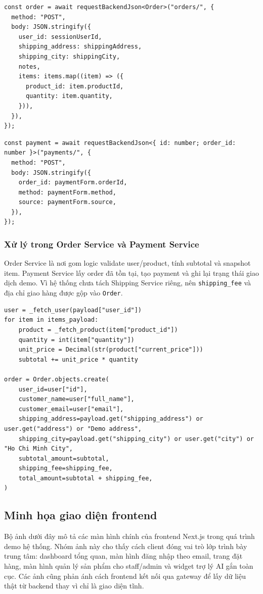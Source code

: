\documentclass[12pt,a4paper]{article}
\begin{document}
\begin{lstlisting}[style=code,caption={Tạo đơn hàng từ giao diện customer order}]
const order = await requestBackendJson<Order>("orders/", {
  method: "POST",
  body: JSON.stringify({
    user_id: sessionUserId,
    shipping_address: shippingAddress,
    shipping_city: shippingCity,
    notes,
    items: items.map((item) => ({
      product_id: item.productId,
      quantity: item.quantity,
    })),
  }),
});
\end{lstlisting}

\begin{lstlisting}[style=code,caption={Dashboard tạo payment từ order}]
const payment = await requestBackendJson<{ id: number; order_id: number }>("payments/", {
  method: "POST",
  body: JSON.stringify({
    order_id: paymentForm.orderId,
    method: paymentForm.method,
    source: paymentForm.source,
  }),
});
\end{lstlisting}

\subsubsection{Xử lý trong Order Service và Payment Service}
Order Service là nơi gom logic validate user/product, tính subtotal và snapshot item. Payment Service lấy order đã tồn tại, tạo payment và ghi lại trạng thái giao dịch demo. Vì hệ thống chưa tách Shipping Service riêng, nên \texttt{shipping\_fee} và địa chỉ giao hàng được gộp vào \texttt{Order}.

\begin{lstlisting}[style=code,caption={Logic tạo order và payment rút gọn theo code hiện tại}]
user = _fetch_user(payload["user_id"])
for item in items_payload:
    product = _fetch_product(item["product_id"])
    quantity = int(item["quantity"])
    unit_price = Decimal(str(product["current_price"]))
    subtotal += unit_price * quantity

order = Order.objects.create(
    user_id=user["id"],
    customer_name=user["full_name"],
    customer_email=user["email"],
    shipping_address=payload.get("shipping_address") or user.get("address") or "Demo address",
    shipping_city=payload.get("shipping_city") or user.get("city") or "Ho Chi Minh City",
    subtotal_amount=subtotal,
    shipping_fee=shipping_fee,
    total_amount=subtotal + shipping_fee,
)
\end{lstlisting}

\subsection{Minh họa giao diện frontend}
Bộ ảnh dưới đây mô tả các màn hình chính của frontend Next.js trong quá trình demo hệ thống. Nhóm ảnh này cho thấy cách client đóng vai trò lớp trình bày trung tâm: dashboard tổng quan, màn hình đăng nhập theo email, trang đặt hàng, màn hình quản lý sản phẩm cho staff/admin và widget trợ lý AI gắn toàn cục. Các ảnh cũng phản ánh cách frontend kết nối qua gateway để lấy dữ liệu thật từ backend thay vì chỉ là giao diện tĩnh.
\end{document}
